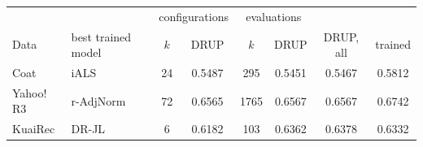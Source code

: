 \begin{tabular}{llcccccc}
\toprule
 & & \multicolumn{2}{c}{configurations} & \multicolumn{2}{c}{evaluations} & & \\
Data & best trained model & $k$ & DRUP & $k$ & DRUP & DRUP, all & trained\\
\midrule
Coat & iALS & 24 & 0.5487 & 295 & 0.5451 & 0.5467 & 0.5812\\
Yahoo!\,R3 & r-AdjNorm & 72 & 0.6565 & 1765 & 0.6567 & 0.6567 & 0.6742\\
KuaiRec & DR-JL & 6 & 0.6182 & 103 & 0.6362 & 0.6378 & 0.6332\\
\bottomrule
\end{tabular}

